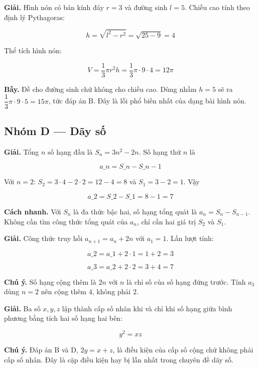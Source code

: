 \documentclass[11pt, a4paper]{article}
\begin{document}
\begin{dapan}[19 — Đáp án A]
\textbf{Giải.} Hình nón có bán kính đáy $r = 3$ và đường sinh $l = 5$. Chiều cao tính theo định lý Pythagoras:

$$h = \sqrt{l^2 - r^2} = \sqrt{25 - 9} = 4$$

Thể tích hình nón:

$$V = \frac{1}{3}\pi r^2 h = \frac{1}{3}\pi \cdot 9 \cdot 4 = 12\pi$$

\textbf{Bẫy.} Đề cho đường sinh chứ không cho chiều cao. Dùng nhầm $h = 5$ sẽ ra $\dfrac{1}{3}\pi \cdot 9 \cdot 5 = 15\pi$, tức đáp án B. Đây là lỗi phổ biến nhất của dạng bài hình nón.
\end{dapan}

\subsection*{Nhóm D — Dãy số}

\begin{dapan}[20 — Đáp án B]
\textbf{Giải.} Tổng $n$ số hạng đầu là $S_n = 3n^2 - 2n$. Số hạng thứ $n$ là

$$a\_n = S\_n - S\_{n-1}$$

Với $n = 2$: $S_2 = 3 \cdot 4 - 2 \cdot 2 = 12 - 4 = 8$ và $S_1 = 3 - 2 = 1$. Vậy

$$a\_2 = S\_2 - S\_1 = 8 - 1 = 7$$

\textbf{Cách nhanh.} Với $S_n$ là đa thức bậc hai, số hạng tổng quát là $a_n = S_n - S_{n-1}$. Không cần tìm công thức tổng quát của $a_n$, chỉ cần hai giá trị $S_2$ và $S_1$.
\end{dapan}

\begin{dapan}[21 — Đáp án D]
\textbf{Giải.} Công thức truy hồi $a_{n+1} = a_n + 2n$ với $a_1 = 1$. Lần lượt tính:

$$a\_2 = a\_1 + 2 \cdot 1 = 1 + 2 = 3$$

$$a\_3 = a\_2 + 2 \cdot 2 = 3 + 4 = 7$$

\textbf{Chú ý.} Số hạng cộng thêm là $2n$ với $n$ là chỉ số của số hạng đứng trước. Tính $a_3$ dùng $n = 2$ nên cộng thêm $4$, không phải $2$.
\end{dapan}

\begin{dapan}[22 — Đáp án C]
\textbf{Giải.} Ba số $x, y, z$ lập thành cấp số nhân khi và chỉ khi số hạng giữa bình phương bằng tích hai số hạng hai bên:

$$y^2 = xz$$

\textbf{Chú ý.} Đáp án B và D, $2y = x + z$, là điều kiện của cấp số cộng chứ không phải cấp số nhân. Đây là cặp điều kiện hay bị lẫn nhất trong chuyên đề dãy số.
\end{dapan}
\end{document}
